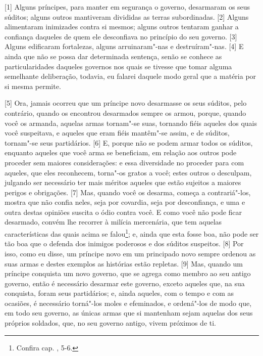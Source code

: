 
{[}1{]} Alguns príncipes, para manter em segurança o governo, desarmaram
os seus súditos; alguns outros mantiveram divididas as terras
subordinadas. {[}2{]} Alguns alimentaram inimizades contra si mesmos;
alguns outros tentaram ganhar a confiança daqueles de quem ele
desconfiava no princípio do seu governo. {[}3{]} Alguns edificaram
fortalezas, alguns arruinaram"-nas e destruíram"-nas. {[}4{]} E ainda que
não se possa dar determinada sentença, senão se conhece as
particularidades daqueles governos nos quais se tivesse que tomar alguma
semelhante deliberação, todavia, eu falarei daquele modo geral que a
matéria por si mesma permite.

{[}5{]} Ora, jamais ocorreu que um príncipe novo desarmasse os seus
súditos, pelo contrário, quando os encontrou desarmados sempre os armou,
porque, quando você os armanda, aquelas armas tornam"-se suas, tornando
fiéis aqueles dos quais você suspeitava, e aqueles que eram fiéis
mantêm"-se assim, e de súditos, tornam"-se seus partidários. {[}6{]} E,
porque não se podem armar todos os súditos, enquanto aqueles que você
arma se beneficiam, em relação aos outros pode proceder sem maiores
considerações: e essa diversidade no proceder para com aqueles, que eles
reconhecem, torna"-os gratos a você; estes outros o desculpam, julgando
ser necessário ter mais méritos aqueles que estão sujeitos a maiores
perigos e obrigações. {[}7{]} Mas, quando você os desarma, começa a
contrariá"-los, mostra que não confia neles, seja por covardia, seja por
desconfiança, e uma e outra destas opiniões suscita o ódio contra você.
E como você não pode ficar desarmado, convém lhe recorrer à milícia
mercenária, que tem aquelas características das quais acima se
falou\footnote{Confira cap. , 5-6.}; e, ainda que esta fosse boa,
não pode ser tão boa que o defenda dos inimigos poderosos e dos súditos
suspeitos. {[}8{]} Por isso, como eu disse, um príncipe novo em um
principado novo sempre ordenou as suas armas e destes exemplos as
histórias estão repletas. {[}9{]} Mas, quando um príncipe conquista um
novo governo, que se agrega como membro ao seu antigo governo, então é
necessário desarmar este governo, exceto aqueles que, na sua conquista,
foram seus partidários; e, ainda aqueles, com o tempo e com as ocasiões,
é necessário torná"-los moles e efeminados, e ordená"-los de modo que, em
todo seu governo, as únicas armas que si mantenham sejam aquelas dos
seus próprios soldados, que, no seu governo antigo, vivem próximos de
ti.

